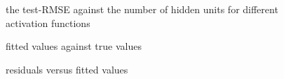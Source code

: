 \documentclass{article}
\begin{document}
\begin{figure}[!htbp]
\centering
{}
\caption{the test-RMSE against the number of hidden units for different activation functions} \label{1_nn}
\end{figure}

\begin{figure}[!htbp]
\centering
{}
\caption{fitted values against true values} \label{1_nn1}
\end{figure}

\begin{figure}[!htbp]
\centering
{}
\caption{residuals versus fitted values} \label{1_nn2}
\end{figure}
\end{document}
